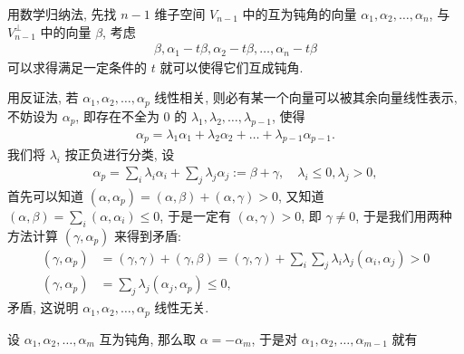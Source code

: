 \begin{exercise}[series=exer]
\begin{hint}
\begin{hintsheet}
            \item 用数学归纳法, 先找 $ n - 1 $ 维子空间 $ V_{n - 1} $ 中的互为钝角的向量 $ \alpha_{1}, \alpha_{2}, \dots, \alpha_{n} $, 与 $ V_{n - 1}^{\bot} $ 中的向量 $ \beta $, 考虑
            \begin{align*}
                \beta, \alpha_{1} - t\beta, \alpha_{2} - t\beta, \dots, \alpha_{n} - t\beta
            \end{align*}
            可以求得满足一定条件的 $ t $ 就可以使得它们互成钝角.
        \end{hintsheet}
    \end{hint}
    \begin{answer}
        \begin{answersheet}
            \item 用反证法, 若 $ \alpha_{1}, \alpha_{2}, \dots, \alpha_{p} $ 线性相关, 则必有某一个向量可以被其余向量线性表示, 不妨设为 $ \alpha_{p} $, 即存在不全为 $ 0 $ 的 $ \lambda_{1}, \lambda_{2}, \dots, \lambda_{p - 1} $, 使得
            \begin{align*}
                \alpha_{p} = \lambda_{1}\alpha_{1} + \lambda_{2}\alpha_{2} + \dots + \lambda_{p - 1}\alpha_{p - 1}.
            \end{align*}
            我们将 $ \lambda_{i} $ 按正负进行分类, 设
            \begin{align*}
                \alpha_{p} = \sum_{i}\lambda_{i}\alpha_{i} + \sum_{j}\lambda_{j}\alpha_{j} := \beta + \gamma,\quad \lambda_{i} \le 0, \lambda_{j} > 0,
            \end{align*}
            首先可以知道 $ (\alpha, \alpha_{p}) = (\alpha, \beta) + (\alpha, \gamma) > 0 $, 又知道 $ (\alpha, \beta) = \sum_{i}(\alpha, \alpha_{i}) \le 0 $, 于是一定有 $ (\alpha, \gamma) > 0 $, 即 $ \gamma \ne 0 $, 于是我们用两种方法计算 $ (\gamma, \alpha_{p}) $ 来得到矛盾:
            \begin{align*}
                (\gamma, \alpha_{p}) & = (\gamma, \gamma) + (\gamma, \beta) = (\gamma, \gamma) + \sum_{i}\sum_{j}\lambda_{i}\lambda_{j}(\alpha_{i}, \alpha_{j}) > 0 \\
                (\gamma, \alpha_{p}) & = \sum_{j}\lambda_{j}(\alpha_{j}, \alpha_{p}) \le 0,
            \end{align*}
            矛盾, 这说明 $ \alpha_{1}, \alpha_{2}, \dots, \alpha_{p} $ 线性无关.
            \item 设 $ \alpha_{1}, \alpha_{2}, \dots, \alpha_{m} $ 互为钝角, 那么取 $ \alpha = -\alpha_{m} $, 于是对 $ \alpha_{1}, \alpha_{2}, \dots, \alpha_{m - 1} $ 就有

\end{answersheet}
\end{answer}
\end{exercise}
